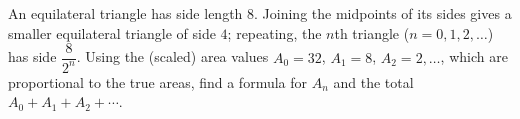 An equilateral triangle has side length $8$. Joining the midpoints of its sides gives a smaller equilateral triangle of side $4$; repeating, the $n$th triangle ($n=0,1,2,\dots$) has side $\dfrac8{2^n}$. Using the (scaled) area values $A_0=32$, $A_1=8$, $A_2=2,\dots$, which are proportional to the true areas, find a formula for $A_n$ and the total $A_0+A_1+A_2+\cdots$.
